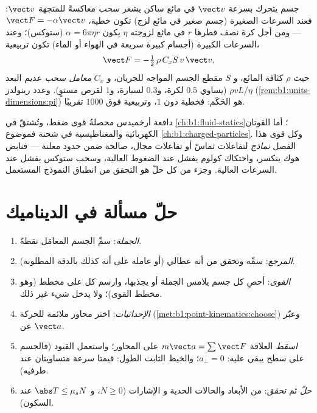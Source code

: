 \begin{proposition}\label{prop:b1:newton-dynamics:drag}
جسم يتحرك بسرعة $\vect v$ في مائع ساكن يشعر  \emph{سحب}
معاكسةً للمتجهة $\vect v$: فعند السرعات الصغيرة (جسم صغير في مائع
لزج) تكون خطية، $\vect F = -\alpha\vect v$ --- ومن أجل كرة نصف
قطرها $r$ في مائع لزوجته $\eta$ يكون $\alpha = 6\pi\eta r$
(ستوكس)؛ وعند السرعات الكبيرة (أجسام كبيرة سريعة في الهواء أو الماء) تكون
تربيعية،
\[
\vect F = -\tfrac12\,\rho\,C_xS\,v\,\vect v ,
\]
حيث $\rho$ كثافة المائع، و $S$ مقطع الجسم المواجه
للجريان، و $C_x$ \emph{معامل سحب} عديم البعد (يساوي $0.5$ لكرة،
و$0.3$ لسيارة، و$1$ لقرص مستوٍ). وعدد رينولدز
$\rho vL/\eta$ (\cref{rem:b1:units-dimensions:pi}) هو الحَكَم: فخطية
دون $1$، وتربيعية فوق $1000$ تقريبًا.
\end{proposition}
\admitted

\begin{remark}\label{rem:b1:newton-dynamics:others}
دافعة أرخميدس محصلةُ قوى ضغط، وتُشتقّ في
\cref{ch:b1:fluid-statics}؛ أما القوتان الكهربائية والمغناطيسية في
شحنة فموضوع \cref{ch:b1:charged-particles}. وكل قوى
هذا الفصل \emph{نماذج} لتفاعلات تماسّ أو تفاعلات
مجال، صالحة ضمن حدود معلنة --- فنابض هوك ينكسر،
واحتكاك كولوم يفشل عند الضغوط العالية، وسحب ستوكس يفشل عند
السرعات العالية. وجزء من كل حلّ هو التحقق من انطباق النموذج المستعمل.
\end{remark}

\section{حلّ مسألة في الديناميك}

\begin{method}\label{met:b1:newton-dynamics:method}
\begin{enumerate}
  \item \emph{الجملة}: سمِّ الجسم المعامَل نقطةً.
  \item \emph{المرجع}: سمِّه وتحقق من أنه عطالي (أو عامله
        على أنه كذلك بالدقة المطلوبة).
  \item \emph{القوى}: أحصِ كل جسم يلامس الجملة أو يجذبها،
        وارسم كل  على مخطط (وهو مخطط القوى)؛
        ولا يدخل شيء غير ذلك.
  \item \emph{الإحداثيات}: اختر محاور ملائمة للحركة
        (\cref{met:b1:point-kinematics:choose}) وعبّر عن $\vect a$.
  \item \emph{اسقط} العلاقة $m\vect a = \sum\vect F$ على المحاور؛ واستعمل
        القيود (فالجسم على سطح يبقى عليه: $a_\perp = 0$؛ والخيط
        الثابت الطول: قيمتا سرعة متساويتان عند طرفيه).
  \item \emph{حلّ} ثم \emph{تحقق}: من الأبعاد والحالات الحدية و
        الإشارات ($N \geq 0$، و $\abs T \leq \mu_sN$ عند السكون).
\end{enumerate}
\end{method}

